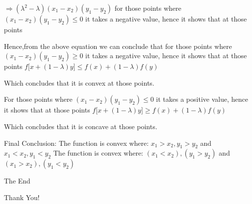 \documentclass{beamer}
\begin{document}
\begin{frame}
    


$\Rightarrow$$(\lambda^{2}-\lambda)(x_{1}-x_{2})(y_{1}-y_{2})$\newline
for those  points where $(x_{1}-x_{2})(y_{1}-y_{2})\leq0$ it takes a negative value, hence it shows that at those points \newline

Hence,from the above equation we can conclude that for those  points where $(x_{1}-x_{2})(y_{1}-y_{2})\geq0$ it takes a negative value, hence it shows that at those points \newline
$f[$\lambda$x+(1-\lambda)y] \leq $\lambda$f(x)+(1-\lambda)f(y)$\newline

Which concludes that it is convex at those points.\newline

For those  points where $(x_{1}-x_{2})(y_{1}-y_{2})\leq0$ it takes a positive value, hence it shows that at those points \newline
$f[$\lambda$x+(1-\lambda)y] \geq $\lambda$f(x)+(1-\lambda)f(y)$\newline

Which concludes that it is concave at those points.

\end{frame}


\begin{frame}
    
Final Conclusion: \newline \newline
      The function is convex where: \newline
         $x_{1}>x_{2} , y_{1}>y_{2}$ and
         $x_{1}<x_{2} , y_{1}<y_{2}$ \newline
      The function is convex where: \newline
         $(x_{1}<x_{2}) , (y_{1}>y_{2})$ and
         $(x_{1}>x_{2}) , (y_{1}<y_{2})$
\end{frame}




\begin{frame}
\Huge{\centerline{The End}}
\quad \quad\quad \quad \quad Thank You!
\end{frame}

\end{document}

